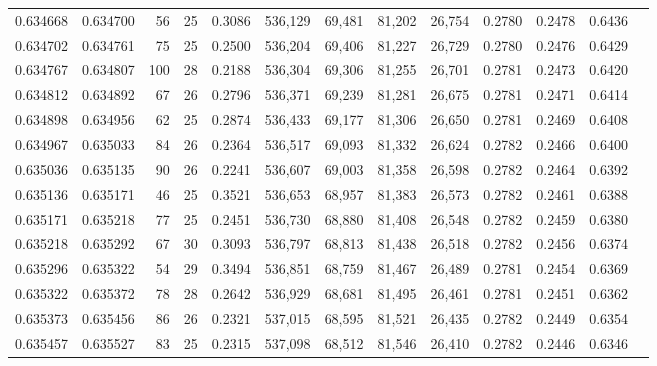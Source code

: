 \begin{tabular}{rrrrrrrrrrrrr}
0.634668 & 0.634700 &  56 &  25 &                                     0.3086 & 536,129 &  69,481 &  81,202 &  26,754 & 0.2780 & 0.2478 & 0.6436 \\
0.634702 & 0.634761 &  75 &  25 &                                     0.2500 & 536,204 &  69,406 &  81,227 &  26,729 & 0.2780 & 0.2476 & 0.6429 \\
0.634767 & 0.634807 & 100 &  28 &                                     0.2188 & 536,304 &  69,306 &  81,255 &  26,701 & 0.2781 & 0.2473 & 0.6420 \\
0.634812 & 0.634892 &  67 &  26 &                                     0.2796 & 536,371 &  69,239 &  81,281 &  26,675 & 0.2781 & 0.2471 & 0.6414 \\
0.634898 & 0.634956 &  62 &  25 &                                     0.2874 & 536,433 &  69,177 &  81,306 &  26,650 & 0.2781 & 0.2469 & 0.6408 \\
0.634967 & 0.635033 &  84 &  26 &                                     0.2364 & 536,517 &  69,093 &  81,332 &  26,624 & 0.2782 & 0.2466 & 0.6400 \\
0.635036 & 0.635135 &  90 &  26 &                                     0.2241 & 536,607 &  69,003 &  81,358 &  26,598 & 0.2782 & 0.2464 & 0.6392 \\
0.635136 & 0.635171 &  46 &  25 &                                     0.3521 & 536,653 &  68,957 &  81,383 &  26,573 & 0.2782 & 0.2461 & 0.6388 \\
0.635171 & 0.635218 &  77 &  25 &                                     0.2451 & 536,730 &  68,880 &  81,408 &  26,548 & 0.2782 & 0.2459 & 0.6380 \\
0.635218 & 0.635292 &  67 &  30 &                                     0.3093 & 536,797 &  68,813 &  81,438 &  26,518 & 0.2782 & 0.2456 & 0.6374 \\
0.635296 & 0.635322 &  54 &  29 &                                     0.3494 & 536,851 &  68,759 &  81,467 &  26,489 & 0.2781 & 0.2454 & 0.6369 \\
0.635322 & 0.635372 &  78 &  28 &                                     0.2642 & 536,929 &  68,681 &  81,495 &  26,461 & 0.2781 & 0.2451 & 0.6362 \\
0.635373 & 0.635456 &  86 &  26 &                                     0.2321 & 537,015 &  68,595 &  81,521 &  26,435 & 0.2782 & 0.2449 & 0.6354 \\
0.635457 & 0.635527 &  83 &  25 &                                     0.2315 & 537,098 &  68,512 &  81,546 &  26,410 & 0.2782 & 0.2446 & 0.6346 \\

\end{tabular}
